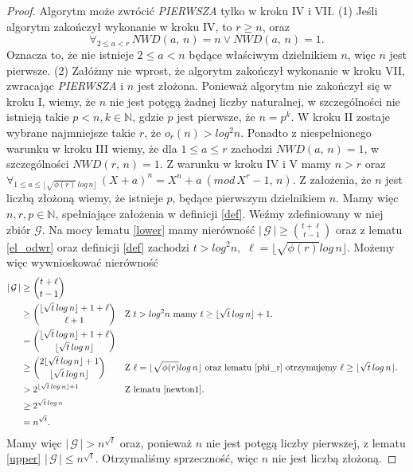 \documentclass[declaration,shortabstract]{iithesis}
\theoremstyle{definition}
\theoremstyle{remark} \newtheorem{observation}{Obserwacja}
\theoremstyle{plain} \newtheorem{theorem}{Twierdzenie}
\theoremstyle{plain} \newtheorem{lemma}{Lemat}
\theoremstyle{remark} \newtheorem*{remark*}{Uwaga}
\theoremstyle{reminder} \newtheorem*{reminder*}{Przypomnienie}
\begin{document}
\begin{proof}
	Algorytm może zwrócić \textit{PIERWSZA} tylko w kroku IV i VII. \newline
	(1) Jeśli algorytm zakończył wykonanie w kroku IV, to $r \geq n$, oraz \[\forall_{2 \leq a < r} \, NWD(a, \, n) = n \vee NWD(a, \, n) = 1.\] Oznacza to, że nie istnieje $2 \leq a < n$ będące właściwym dzielnikiem $n$, więc $n$ jest pierwsze.\newline
	(2) Załóżmy nie wprost, że algorytm zakończył wykonanie w kroku VII, zwracając \textit{PIERWSZA} i $n$ jest złożona. Ponieważ algorytm nie zakończył się w kroku I, wiemy, że $n$ nie jest potęgą żadnej liczby naturalnej, w szczególności nie istnieją takie $p < n, k \in \mathbb{N}$, gdzie $p$ jest pierwsze, że $n = p^k$. W kroku II zostaje wybrane najmniejsze takie $r$, że $o_r(n) > log^2n$. Ponadto z niespełnionego warunku w kroku III wiemy, że dla $1 \leq a \leq r$ zachodzi $NWD(a, \, n) = 1$, w szczególności $NWD(r, \, n) = 1$. Z warunku w kroku IV i V mamy $n > r$ oraz ${\forall_{1 \leq a \leq \lfloor \sqrt{\phi(r)} \, log \, n \rfloor} \, (X + a)^n = X^n + a \: (mod \, X^r - 1, \, n).}$ Z założenia, że $n$ jest liczbą złożoną wiemy, że istnieje $p$, będące pierwszym dzielnikiem $n$. Mamy więc $n, r, p \in \mathbb{N}$, spełniające założenia w definicji \ref{def}. Weźmy zdefiniowany w niej zbiór $\mathcal{G}$. Na mocy lematu \ref{lower} mamy nierówność $| \, \mathcal{G} \, | \geq {t + \ell \choose t - 1}$ oraz z lematu \ref{el_odwr} oraz definicji \ref{def} zachodzi ${t > log^2n,}$ ${\ell = \lfloor \sqrt{\phi(r)}log \, n \rfloor.}$ Możemy więc wywnioskować nierówność
	\begin{align*}
		| \, \mathcal{G} \, | &\geq {t + \ell \choose t - 1} \\
		  & \geq {\lfloor \sqrt{t}\, log \, n \rfloor + 1 + \ell \choose \ell + 1}                      &   & \text{Z ${t > log^2n}$ mamy ${t \geq \lfloor \sqrt{t}\, log \, n} \rfloor + 1$.}                                                               \\
		& = {\lfloor \sqrt{t}\, log \, n \rfloor + 1 + \ell \choose \lfloor \sqrt{t}\, log \, n \rfloor} \\
		  & \geq {2\lfloor \sqrt{t}\, log \, n \rfloor + 1 \choose \lfloor \sqrt{t}\, log \, n \rfloor} &   & \text{Z $\ell = \lfloor \sqrt{\phi(r)}log \, n \rfloor$ oraz lematu \ref{phi_r} otrzymujemy $\ell \geq \lfloor \sqrt{t} \, log \, n \rfloor$.} \\
		  & > 2^{\lfloor \sqrt{t}\, log \, n \rfloor + 1}                                               &   & \text{Z lematu \ref{newton1}.}                                                                                                                 \\
		&\geq 2^{\sqrt{t}\,log \,n} \\
		&= n^{\sqrt{t}}.
	\end{align*}
	Mamy więc $| \, \mathcal{G} \, | > n ^{\sqrt{t}}$ oraz, ponieważ $n$ nie jest potęgą liczby pierwszej, z lematu \ref{upper} $| \, \mathcal{G} \, | \leq n^{\sqrt{t}}.$ Otrzymaliśmy sprzeczność, więc $n$ nie jest liczbą złożoną.
\end{proof}
	
\end{document}
